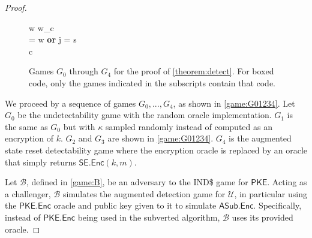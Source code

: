\begin{proof}
\begin{figure}
\begin{pchstack}
\begin{pcvstack}
\begin{pchstack}
{	\pcind w \leftarrow w_c \\
	\pcuntil \kappa = w \textbf{ or } j = s \\
	\pcreturn c
}
\end{pchstack}
\end{pcvstack}
\end{pchstack}
\caption[Games $G_0$ through $G_4$ for the proof of \autoref{theorem:detect}]{Games $G_0$ through $G_4$ for the proof of \autoref{theorem:detect}. For boxed code, only the games indicated in the subscripts contain that code.}
\label{game:G01234}
\end{figure}

We proceed by a sequence of games $G_0,...,G_4$, as shown in \autoref{game:G01234}. Let $G_0$ be the undetectability game with the random oracle implementation. $G_1$ is the same as $G_0$ but with $\kappa$ sampled randomly instead of computed as an encryption of $k$. $G_2$ and $G_3$ are shown in \autoref{game:G01234}. $G_4$ is the augmented state reset detectability game where the encryption oracle is replaced by an oracle that simply returns $\mathsf{SE.Enc}(k,m)$.

\iffullversion

Let $\mathcal{B}$, defined in \autoref{game:B}, be an adversary to the IND\$ game for $\mathsf{PKE}$. Acting as a challenger, $\mathcal{B}$ simulates the augmented detection game for $\mathcal{U}$, in particular using the $\mathsf{PKE.Enc}$ oracle and public key given to it to simulate $\mathsf{ASub.Enc}$. Specifically, instead of $\mathsf{PKE.Enc}$ being used in the subverted algorithm, $\mathcal{B}$ uses its provided oracle.


\end{proof}
